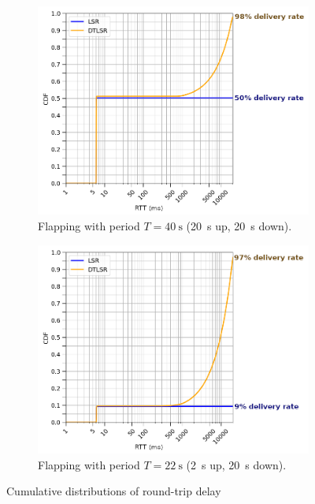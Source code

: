 \documentclass[withindex,glossary,openany]{cam-thesis}
\begin{document}
\begin{figure}
\centering
\begin{subfigure}{.8\textwidth}
  \centering
  \hspace*{1.1cm}
  \includegraphics[width=1\linewidth]{delay_partition_flap20}
  \caption{Flapping with period $T=\SI{40}{\s}$ (\SI{20}{\s} up, \SI{20}{\s} down).}
  \label{fig:partition_20}
\end{subfigure}

\begin{subfigure}{.8\textwidth}
  \centering
  \hspace*{1.1cm}
  \includegraphics[width=1\linewidth]{delay_partition_flap2_20}
  \caption{Flapping with period $T=\SI{22}{\s}$ (\SI{2}{\s} up, \SI{20}{\s} down).}
  \label{fig:partition_2_20}
\end{subfigure}

\caption{Cumulative distributions of round-trip delay}
\label{fig:partition}
\end{figure}
\end{document}
